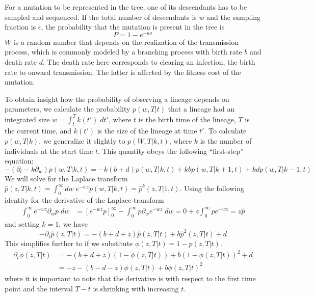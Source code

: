 \documentclass[9pt,twocolumn,twoside]{gsajnl_modified}
\begin{document}
For a mutation to be represented in the tree, one of its descendants has to be sampled and sequenced.
If the total number of descendants is $w$ and the sampling fraction is $\epsilon$, the probability that the mutation is present in the tree is
\begin{equation}
    P = 1 - e^{-w\epsilon}
\end{equation}
$W$ is a random number that depends on the realization of the transmission process, which is commonly modeled by a branching process with birth rate $b$ and death rate $d$.
The death rate here corresponds to clearing an infection, the birth rate to onward transmission. The latter is affected by the fitness cost of the mutation.

To obtain insight how the probability of observing a lineage depends on parameters, we calculate the probability $p(w, T|t)$ that a lineage had an integrated size $w = \int_t^T k(t') \; dt'$, where $t$ is the birth time of the lineage, $T$ is the current time, and $k(t')$ is the size of the lineage at time $t'$.
To calculate $p(w,T|k)$, we generalize it slightly to $p(W, T|k,t)$, where $k$ is the number of individuals at the start time $t$. This quantity obeys the following ``first-step'' equation:
\begin{equation}
    -(\partial_t - k \partial_w) p(w,T|k,t) = -k(b+d) p(w,T|k,t) + k b p(w,T|k+1,t) + k d p(w,T| k-1, t)
\end{equation}
We will solve for the Laplace transform $\hat{p}(z,T|k,t) = \int_0^\infty dw\; e^{-wz} p(w,T|k,t) = \hat{p}^k(z,T|1,t)$.
Using the following identity for the derivative of the Laplace transform
\begin{equation}
    \begin{split}
        \int_0^\infty e^{-wz} \partial_w p  \; dw& = [e^{-wz} p]_0^\infty - \int_0^\infty  p \partial_w e^{-wz} \; dw = 0 + z \int_0^\infty  p e^{-wz} = z \hat{p}
    \end{split}
\end{equation}
and setting $k=1$, we have
\begin{equation}
    -\partial_t \hat{p}(z,T|t) = -(b+d+z) \hat{p}(z,T|t) + b \hat{p}^2(z,T|t) + d
\end{equation}
This simplifies further to if we substitute $\phi(z,T|t) = 1 - \hat{p}(z,T|t)$.
\begin{equation}
    \begin{split}
        \partial_t \phi(z,T|t) & = -(b+d+z) (1-\phi(z,T|t)) + b (1-\phi(z,T|t))^2 + d \\
         & = -z - (b-d-z) \phi(z,T|t) + b \phi(z,T|t)^2
    \end{split}
\end{equation}
where it is important to note that the derivative is with respect to the first time point and the interval $T-t$ is shrinking with increasing $t$.
\end{document}
